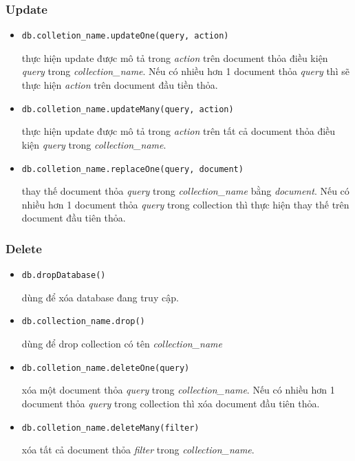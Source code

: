 \subsubsection{Update}
\begin{itemize}
\item
\begin{lstlisting}
db.colletion_name.updateOne(query, action)
\end{lstlisting}
thực hiện update được mô tả trong \textit{action} trên document thỏa điều kiện \textit{query} trong \textit{collection\_name}. Nếu có nhiều hơn 1 document thỏa \textit{query} thì sẽ thực hiện \textit{action} trên document đầu tiền thỏa.
\item
\begin{lstlisting}
db.colletion_name.updateMany(query, action)
\end{lstlisting}
thực hiện update được mô tả trong \textit{action} trên tất cả document thỏa điều kiện \textit{query} trong \textit{collection\_name}.
\item
\begin{lstlisting}
db.colletion_name.replaceOne(query, document)
\end{lstlisting}
thay thế document thỏa \textit{query} trong \textit{collection\_name} bằng \textit{document}. Nếu có nhiều hơn 1 document thỏa \textit{query} trong collection thì thực hiện thay thế trên document đầu tiên thỏa.
\end{itemize}
\subsubsection{Delete}
\begin{itemize}
\item
\begin{lstlisting}
db.dropDatabase()
\end{lstlisting}
dùng để xóa database đang truy cập.
\item
\begin{lstlisting}
db.collection_name.drop()
\end{lstlisting}
dùng để drop collection có tên \textit{collection\_name}
\item
\begin{lstlisting}
db.colletion_name.deleteOne(query)
\end{lstlisting}
xóa một document thỏa \textit{query} trong \textit{collection\_name}. Nếu có nhiều hơn 1 document thỏa \textit{query} trong collection thì xóa document đầu tiên thỏa.
\item
\begin{lstlisting}
db.colletion_name.deleteMany(filter)
\end{lstlisting}
xóa tất cả document thỏa \textit{filter} trong \textit{collection\_name}.
\end{itemize}
